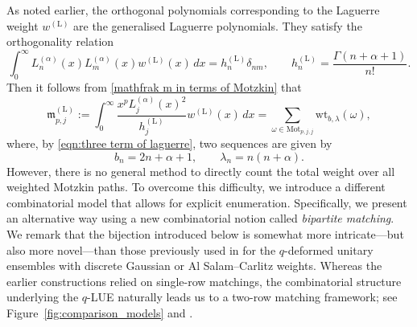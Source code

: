 \documentclass{amsart}
\theoremstyle{plain}
\theoremstyle{remark}
\numberwithin{equation}{section}
\begin{document}
As noted earlier, the orthogonal polynomials corresponding to the Laguerre 
weight $w^{(\mathrm{L})}$ are the generalised Laguerre polynomials. 
They satisfy the orthogonality relation 
\begin{equation}
    \int_{0}^{\infty}L_{n}^{(\alpha)}(x)L_{m}^{(\alpha)}(x)w^{(\mathrm{L})}(x)\,dx=h^{(\mathrm{L})}_{n}\delta_{nm},\qquad h_{n}^{(\mathrm{L})}=\frac{\Gamma(n+\alpha+1)}{n!}.
\end{equation} 
Then it follows from \eqref{mathfrak m in terms of Motzkin} that
\begin{equation}\label{eqn:mathfrakml=wtl}    \mathfrak{m}_{p,j}^{(\mathrm{L})}:=\int_{0}^{\infty}\frac{x^{p}L^{(\alpha)}_{j}(x)^{2}}{h_{j}^{(\mathrm{L})}}w^{(\mathrm{L})}(x)\,dx =\sum_{\omega\in\mathrm{Mot}_{p,j,j}}\mathrm{wt}_{b,\lambda}(\omega),
\end{equation}
where, by \eqref{eqn:three term of laguerre}, two sequences are given by
\begin{equation} \label{bn lambdan for Laguerre}
    b_{n}=2n+\alpha+1,\qquad \lambda_{n}=n(n+\alpha). 
\end{equation} 
However, there is no general method to directly count the total weight over all weighted Motzkin paths. To overcome this difficulty, we introduce a different combinatorial model that allows for explicit enumeration. Specifically, we present an alternative way using a new combinatorial notion called \emph{bipartite matching}. We remark that the bijection introduced below is somewhat more intricate---but also more novel---than those previously used in \cite{BFO24,BJO25} for the $q$-deformed unitary ensembles with discrete Gaussian or Al Salam--Carlitz weights. Whereas the earlier constructions relied on single-row matchings, the combinatorial structure underlying the $q$-LUE naturally leads us to a two-row matching framework; see Figure~\ref{fig:comparison_models} and \cite[Figure~4]{BFO24}.
\end{document}
